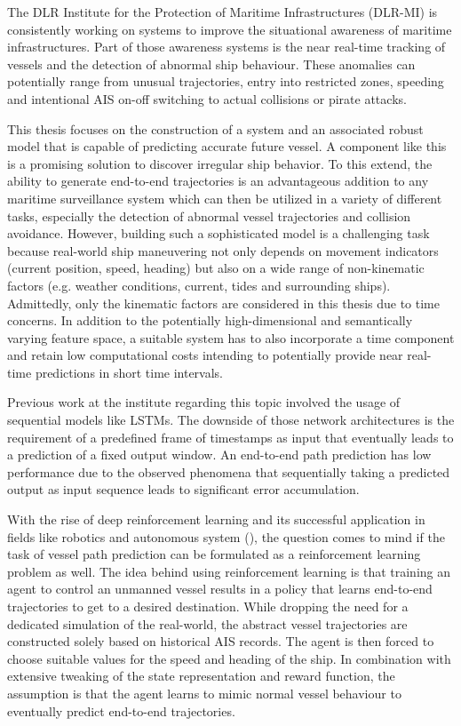 The DLR Institute for the Protection of Maritime Infrastructures (DLR-MI) is consistently working on systems to improve the situational awareness of maritime infrastructures. Part of those awareness systems is the near real-time tracking of vessels and the detection of abnormal ship behaviour. These anomalies can potentially range from unusual trajectories, entry into restricted zones, speeding and intentional AIS on-off switching to actual collisions or pirate attacks.
\par
This thesis focuses on the construction of a system and an associated robust model that is capable of predicting accurate future vessel. A component like this is a promising solution to discover irregular ship behavior. To this extend, the ability to generate end-to-end trajectories is an advantageous addition to any maritime surveillance system which can then be utilized in a variety of different tasks, especially the detection of abnormal vessel trajectories and collision avoidance.
However, building such a sophisticated model is a challenging task because real-world ship maneuvering not only depends on movement indicators (current position, speed, heading) but also on a wide range of non-kinematic factors (e.g. weather conditions, current, tides and surrounding ships). Admittedly, only the kinematic factors are considered in this thesis due to time concerns. In addition to the potentially high-dimensional and semantically varying feature space, a suitable system has to also incorporate a time component and retain low computational costs intending to potentially provide near real-time predictions in short time intervals.
\par
Previous work at the institute regarding this topic involved the usage of sequential models like LSTMs. The downside of those network architectures is the requirement of a predefined frame of timestamps as input that eventually leads to a prediction of a fixed output window. An end-to-end path prediction has low performance due to the observed phenomena that sequentially taking a predicted output as input sequence leads to significant error accumulation.
\par
With the rise of deep reinforcement learning and its successful application in fields like robotics and autonomous system (\cite{s18092905, zare2021continuous, 9195789, martinsen2018curved}), the question comes to mind if the task of vessel path prediction can be formulated as a reinforcement learning problem as well. The idea behind using reinforcement learning is that training an agent to control an unmanned vessel results in a policy that learns end-to-end trajectories to get to a desired destination. While dropping the need for a dedicated simulation of the real-world, the abstract vessel trajectories are constructed solely based on historical AIS records. The agent is then forced to choose suitable values for the speed and heading of the ship. In combination with extensive tweaking of the state representation and reward function, the assumption is that the agent learns to mimic normal vessel behaviour to eventually predict end-to-end trajectories.
